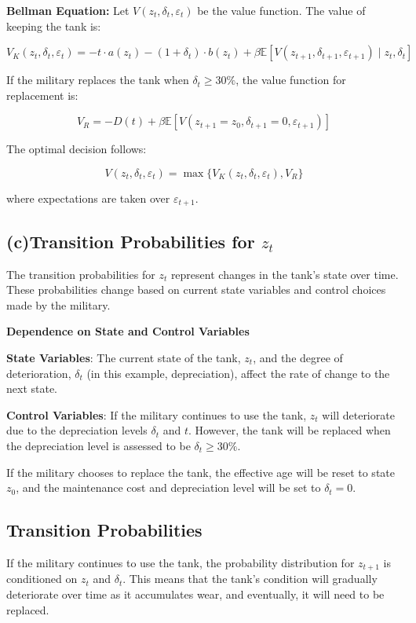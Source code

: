 \documentclass{article}
\begin{document}
\textbf{Bellman Equation:}  
Let \( V(z_t, \delta_t, \varepsilon_t) \) be the value function. The value of keeping the tank is:

\[
V_K(z_t, \delta_t, \varepsilon_t) = - t \cdot a(z_t) - (1+\delta_t) \cdot b(z_t) + \beta \mathbb{E} \left[ V(z_{t+1}, \delta_{t+1}, \varepsilon_{t+1}) \mid z_t, \delta_t \right]
\]

If the military replaces the tank when \( \delta_t \geq 30\% \), the value function for replacement is:

\[
V_R = - D(t) + \beta \mathbb{E} \left[ V(z_{t+1} = z_0, \delta_{t+1} = 0, \varepsilon_{t+1}) \right]
\]

The optimal decision follows:

\[
V(z_t, \delta_t, \varepsilon_t) = \max \{ V_K(z_t, \delta_t, \varepsilon_t), V_R \}
\]

where expectations are taken over \( \varepsilon_{t+1} \).

\subsection*{(c)Transition Probabilities for \( z_t \)}

The transition probabilities for \( z_t \) represent changes in the tank's state over time. These probabilities change based on current state variables and control choices made by the military.

\textbf{Dependence on State and Control Variables}

\textbf{State Variables}: The current state of the tank, \( z_t \), and the degree of deterioration, \( \delta_t \) (in this example, depreciation), affect the rate of change to the next state.

\textbf{Control Variables}: If the military continues to use the tank, \( z_t \) will deteriorate due to the depreciation levels \( \delta_t \) and \( t \). However, the tank will be replaced when the depreciation level is assessed to be \( \delta_t \geq 30\% \).

If the military chooses to replace the tank, the effective age will be reset to state \( z_0 \), and the maintenance cost and depreciation level will be set to \( \delta_t = 0 \).

\subsection*{Transition Probabilities}

If the military continues to use the tank, the probability distribution for \( z_{t+1} \) is conditioned on \( z_t \) and \( \delta_t \). This means that the tank's condition will gradually deteriorate over time as it accumulates wear, and eventually, it will need to be replaced.
\end{document}
